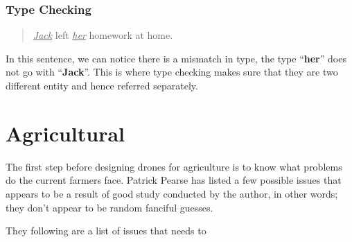 \documentclass{article}
\begin{document}
\begin{multicols}{2}
\subsubsection{Type Checking}
\begin{quotation}
\underline{\textit{Jack}} left \underline{\textit{her}} homework at home.
\end{quotation}
In this sentence, we can notice there is a mismatch in type, the type ``\textbf{her}''  does not go with  ``\textbf{Jack}''. This is where type checking makes sure that they are two different entity and hence referred separately.


\end{multicols}



\clearpage
\section{Agricultural}
The first step before designing drones for agriculture is to know what problems do the current farmers face.  Patrick Pearse has listed a few possible issues that appears to be a result of good study conducted by the author, in other words; they don't appear to be random fanciful guesses. 

They following are a list of issues that needs to 
\end{document}
